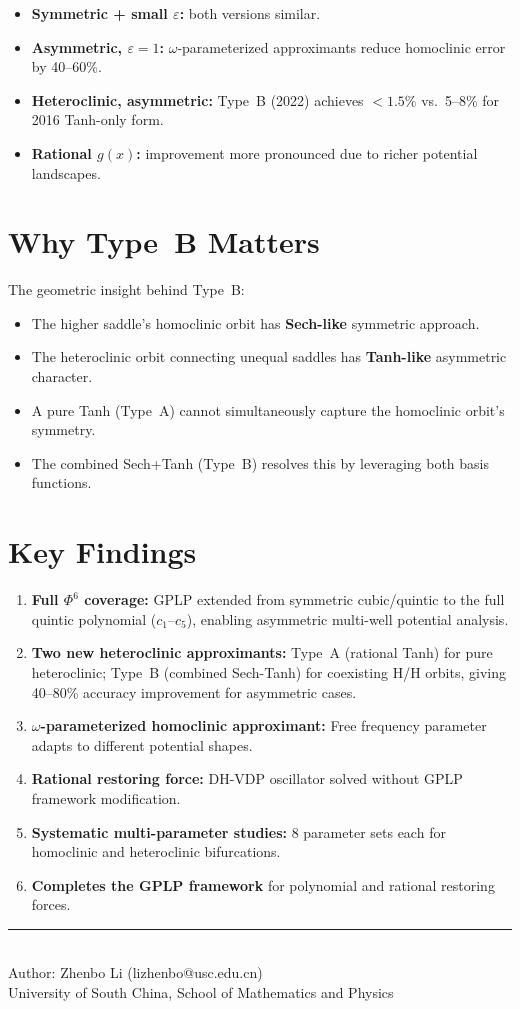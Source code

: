 \documentclass[11pt,a4paper]{article}
\begin{document}
\begin{itemize}[leftmargin=2em]
\item \textbf{Symmetric + small $\varepsilon$:} both versions similar.
\item \textbf{Asymmetric, $\varepsilon=1$:} $\omega$-parameterized approximants reduce homoclinic error by 40--60\%.
\item \textbf{Heteroclinic, asymmetric:} Type~B (2022) achieves $<1.5\%$ vs.\ 5--8\% for 2016 Tanh-only form.
\item \textbf{Rational $g(x)$:} improvement more pronounced due to richer potential landscapes.
\end{itemize}

\section{Why Type~B Matters}

The geometric insight behind Type~B:

\begin{itemize}[leftmargin=2em]
\item The higher saddle's homoclinic orbit has \textbf{Sech-like} symmetric approach.
\item The heteroclinic orbit connecting unequal saddles has \textbf{Tanh-like} asymmetric character.
\item A pure Tanh (Type~A) cannot simultaneously capture the homoclinic orbit's symmetry.
\item The combined Sech+Tanh (Type~B) resolves this by leveraging both basis functions.
\end{itemize}

\section{Key Findings}

\begin{enumerate}[leftmargin=2em]
\item \textbf{Full $\Phi^6$ coverage:} GPLP extended from symmetric cubic/quintic to the full quintic polynomial ($c_1$--$c_5$), enabling asymmetric multi-well potential analysis.
\item \textbf{Two new heteroclinic approximants:} Type~A (rational Tanh) for pure heteroclinic; Type~B (combined Sech-Tanh) for coexisting H/H orbits, giving 40--80\% accuracy improvement for asymmetric cases.
\item \textbf{$\omega$-parameterized homoclinic approximant:} Free frequency parameter adapts to different potential shapes.
\item \textbf{Rational restoring force:} DH-VDP oscillator solved without GPLP framework modification.
\item \textbf{Systematic multi-parameter studies:} 8 parameter sets each for homoclinic and heteroclinic bifurcations.
\item \textbf{Completes the GPLP framework} for polynomial and rational restoring forces.
\end{enumerate}

\vfill
\begin{center}
\small\rule{0.5\textwidth}{0.3pt}\\[4pt]
\small\color{primary} Author: Zhenbo Li (lizhenbo@usc.edu.cn)\\
\small University of South China, School of Mathematics and Physics
\end{center}
\end{document}

